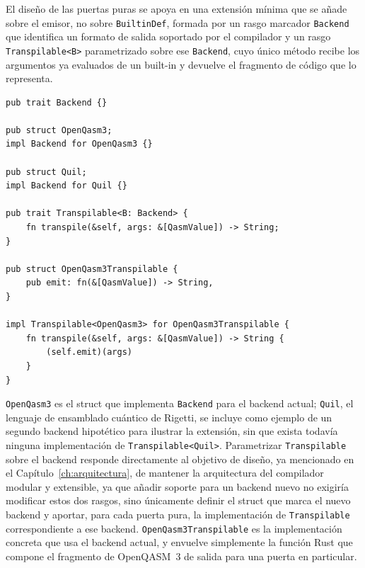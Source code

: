 El diseño de las puertas puras se apoya en una extensión mínima que se añade sobre el emisor, no sobre \lstinline|BuiltinDef|, formada por un rasgo marcador \lstinline|Backend| que identifica un formato de salida soportado por el compilador y un rasgo \lstinline|Transpilable<B>| parametrizado sobre ese \lstinline|Backend|, cuyo único método recibe los argumentos ya evaluados de un built-in y devuelve el fragmento de código que lo representa.

\begin{lstlisting}[language={}, caption=Firmas Backend y Transpilable y su implementación para OpenQASM 3]
pub trait Backend {}

pub struct OpenQasm3;
impl Backend for OpenQasm3 {}

pub struct Quil;
impl Backend for Quil {}

pub trait Transpilable<B: Backend> {
    fn transpile(&self, args: &[QasmValue]) -> String;
}

pub struct OpenQasm3Transpilable {
    pub emit: fn(&[QasmValue]) -> String,
}

impl Transpilable<OpenQasm3> for OpenQasm3Transpilable {
    fn transpile(&self, args: &[QasmValue]) -> String {
        (self.emit)(args)
    }
}
\end{lstlisting}

\lstinline|OpenQasm3| es el struct que implementa \lstinline|Backend| para el backend actual; \lstinline|Quil|, el lenguaje de ensamblado cuántico de Rigetti, se incluye como ejemplo de un segundo backend hipotético para ilustrar la extensión, sin que exista todavía ninguna implementación de \lstinline|Transpilable<Quil>|. Parametrizar \lstinline|Transpilable| sobre el backend responde directamente al objetivo de diseño, ya mencionado en el Capítulo~\ref{ch:arquitectura}, de mantener la arquitectura del compilador modular y extensible, ya que añadir soporte para un backend nuevo no exigiría modificar estos dos rasgos, sino únicamente definir el struct que marca el nuevo backend y aportar, para cada puerta pura, la implementación de \lstinline|Transpilable| correspondiente a ese backend. \lstinline|OpenQasm3Transpilable| es la implementación concreta que usa el backend actual, y envuelve simplemente la función Rust que compone el fragmento de OpenQASM~3 de salida para una puerta en particular.

